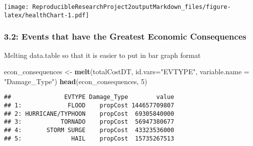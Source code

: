\documentclass[
]{article}
\newenvironment{Shaded}{\begin{snugshade}}{\end{snugshade}}
\newcommand{\DataTypeTok}[1]{\textcolor[rgb]{0.13,0.29,0.53}{#1}}
\newcommand{\DecValTok}[1]{\textcolor[rgb]{0.00,0.00,0.81}{#1}}
\newcommand{\KeywordTok}[1]{\textcolor[rgb]{0.13,0.29,0.53}{\textbf{#1}}}
\newcommand{\NormalTok}[1]{#1}
\newcommand{\StringTok}[1]{\textcolor[rgb]{0.31,0.60,0.02}{#1}}
\begin{document}
\texttt{[image: ReproducibleResearchProject2outputMarkdown\_files/figure-latex/healthChart-1.pdf]}

\hypertarget{events-that-have-the-greatest-economic-consequences}{%
\subsubsection{3.2: Events that have the Greatest Economic
Consequences}\label{events-that-have-the-greatest-economic-consequences}}

Melting data.table so that it is easier to put in bar graph format

\begin{Shaded}
\begin{Highlighting}[]
\NormalTok{econ_consequences <-}\StringTok{ }\KeywordTok{melt}\NormalTok{(totalCostDT, }\DataTypeTok{id.vars=}\StringTok{"EVTYPE"}\NormalTok{, }\DataTypeTok{variable.name =} \StringTok{"Damage_Type"}\NormalTok{)}
\KeywordTok{head}\NormalTok{(econ_consequences, }\DecValTok{5}\NormalTok{)}
\end{Highlighting}
\end{Shaded}

\begin{verbatim}
##               EVTYPE Damage_Type        value
## 1:             FLOOD    propCost 144657709807
## 2: HURRICANE/TYPHOON    propCost  69305840000
## 3:           TORNADO    propCost  56947380677
## 4:       STORM SURGE    propCost  43323536000
## 5:              HAIL    propCost  15735267513
\end{verbatim}
\end{document}
